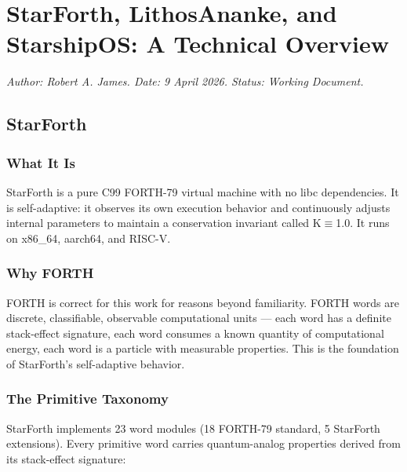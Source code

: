 
\section{StarForth, LithosAnanke, and StarshipOS: A Technical Overview}

\textit{Author: Robert A. James. Date: 9 April 2026. Status: Working Document.}

\subsection{StarForth}

\subsubsection{What It Is}

StarForth is a pure C99 FORTH-79 virtual machine with no libc dependencies.
It is self-adaptive: it observes its own execution behavior and continuously
adjusts internal parameters to maintain a conservation invariant called K$\equiv$1.0.
It runs on x86\_64, aarch64, and RISC-V.

\subsubsection{Why FORTH}

FORTH is correct for this work for reasons beyond familiarity. FORTH words
are discrete, classifiable, observable computational units — each word has
a definite stack-effect signature, each word consumes a known quantity of
computational energy, each word is a particle with measurable properties.
This is the foundation of StarForth's self-adaptive behavior.

\subsubsection{The Primitive Taxonomy}

StarForth implements 23 word modules (18 FORTH-79 standard, 5 StarForth
extensions). Every primitive word carries quantum-analog properties derived
from its stack-effect signature:

